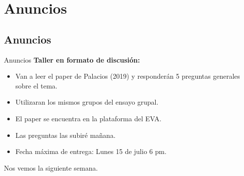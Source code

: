 \documentclass[11pt, aspectratio=169, compress]{beamer}
\makeatletter
\def\beamer@writeslidentry@miniframesoff{%
	\expandafter\beamer@ifempty\expandafter{\beamer@framestartpage}{}%
	{%
		\clearpage\beamer@notesactions%
	}
}
\newcommand*{\miniframesoff}{\let\beamer@writeslidentry=\beamer@writeslidentry@miniframesoff}
\makeatother
\begin{document}
\section{Anuncios}
\subsection{Anuncios}
\begin{frame}{Anuncios}
\textbf{Taller en formato de discusión: }
\begin{itemize}
	\item Van a leer el paper de Palacios (2019) y responderán 5 preguntas generales sobre el tema.
	\item Utilizaran los mismos grupos del ensayo grupal. 
	\item El paper se encuentra en la plataforma del EVA. 
	\item Las preguntas las subiré mañana. 
	\item Fecha máxima de entrega: Lunes 15 de julio 6 pm. 
\end{itemize}
\end{frame}
\miniframesoff 	
\begin{frame}
Nos vemos la siguiente semana. 
\end{frame}
\end{document}
